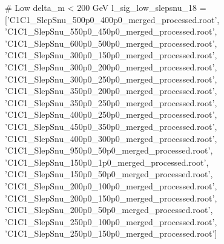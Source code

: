 # Low delta_m < 200 GeV
l_sig_low_slepsnu_18 = ['C1C1_SlepSnu_500p0_400p0_merged_processed.root',
                     'C1C1_SlepSnu_550p0_450p0_merged_processed.root',
                     'C1C1_SlepSnu_600p0_500p0_merged_processed.root',
                     'C1C1_SlepSnu_300p0_150p0_merged_processed.root',
                     'C1C1_SlepSnu_300p0_200p0_merged_processed.root',
                     'C1C1_SlepSnu_300p0_250p0_merged_processed.root',
                     'C1C1_SlepSnu_350p0_200p0_merged_processed.root',
                     'C1C1_SlepSnu_350p0_250p0_merged_processed.root',
                     'C1C1_SlepSnu_400p0_250p0_merged_processed.root',
                     'C1C1_SlepSnu_450p0_350p0_merged_processed.root',
                     'C1C1_SlepSnu_400p0_300p0_merged_processed.root',
                     'C1C1_SlepSnu_950p0_50p0_merged_processed.root',
                     'C1C1_SlepSnu_150p0_1p0_merged_processed.root',
                     'C1C1_SlepSnu_150p0_50p0_merged_processed.root',
                     'C1C1_SlepSnu_200p0_100p0_merged_processed.root',
                     'C1C1_SlepSnu_200p0_150p0_merged_processed.root',
                     'C1C1_SlepSnu_200p0_50p0_merged_processed.root',
                     'C1C1_SlepSnu_250p0_100p0_merged_processed.root',
                     'C1C1_SlepSnu_250p0_150p0_merged_processed.root']



